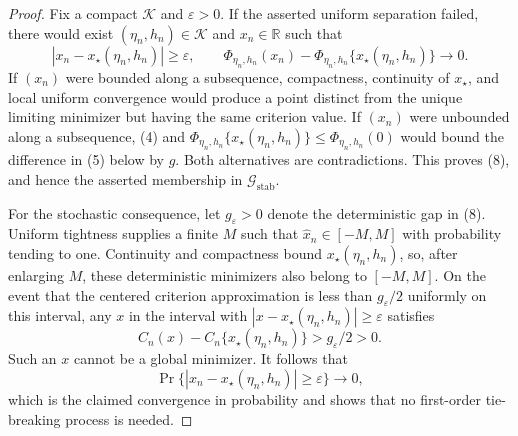 \documentclass{article}
\begin{document}
\begin{proof}
Fix a compact \(\mathcal K\) and \(\varepsilon>0\).  If the asserted uniform separation failed, there would exist \((\eta_n,h_n)\in\mathcal K\) and \(x_n\in\mathbb R\) such that
\[
 |x_n-x_\star(\eta_n,h_n)|\geq\varepsilon,
 \qquad
 \Phi_{\eta_n,h_n}(x_n)-
 \Phi_{\eta_n,h_n}\{x_\star(\eta_n,h_n)\}\longrightarrow0. \tag{5}
\]
If \((x_n)\) were bounded along a subsequence, compactness, continuity of \(x_\star\), and local uniform convergence would produce a point distinct from the unique limiting minimizer but having the same criterion value.  If \((x_n)\) were unbounded along a subsequence, (4) and \(\Phi_{\eta_n,h_n}\{x_\star(\eta_n,h_n)\}\leq\Phi_{\eta_n,h_n}(0)\) would bound the difference in (5) below by \(g\).  Both alternatives are contradictions.  This proves (8), and hence the asserted membership in \(\mathcal G_{\mathrm{stab}}\).

For the stochastic consequence, let \(g_\varepsilon>0\) denote the deterministic gap in (8).  Uniform tightness supplies a finite \(M\) such that \(\widehat x_n\in[-M,M]\) with probability tending to one.  Continuity and compactness bound \(x_\star(\eta_n,h_n)\), so, after enlarging \(M\), these deterministic minimizers also belong to \([-M,M]\).  On the event that the centered criterion approximation is less than \(g_\varepsilon/2\) uniformly on this interval, any \(x\) in the interval with \(|x-x_\star(\eta_n,h_n)|\geq\varepsilon\) satisfies
\[
 C_n(x)-C_n\{x_\star(\eta_n,h_n)\}>g_\varepsilon/2>0.
\]
Such an \(x\) cannot be a global minimizer.  It follows that
\[
 \Pr\{|\widehat x_n-x_\star(\eta_n,h_n)|\geq\varepsilon\}\longrightarrow0,
\]
which is the claimed convergence in probability and shows that no first-order tie-breaking process is needed.


\end{proof}
\end{document}
